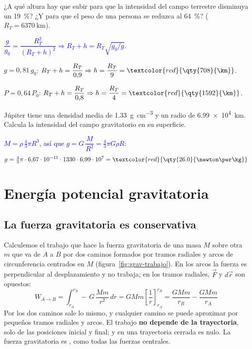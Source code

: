 \begin{exercise}
    ¿A qué altura hay que subir para que la intensidad del campo terrestre disminuya un \qty{19}{\percent}? ¿Y para que el
    peso de una persona se reduzca al \qty{64}{\percent}? (\(R_T = \qty{6370}{\km}\)).
    \begin{solu}
        \textcolor{blue}{\(\dfrac{g}{g_0} = \dfrac{R_T^2}{(R_T + h)^2} \Rightarrow R_T + h = R_T\sqrt{g_0/g}\).}

        \(g = 0{,}81\,g_0\): \(R_T + h = \dfrac{R_T}{0{,}9} \Rightarrow h = \dfrac{R_T}{9} = \textcolor{red}{\qty{708}{\km}}\).

        \(P = 0{,}64\,P_0\): \(R_T + h = \dfrac{R_T}{0{,}8} \Rightarrow h = \dfrac{R_T}{4} = \textcolor{red}{\qty{1592}{\km}}\).
    \end{solu}
\end{exercise}

\begin{exercise}
    Júpiter tiene una densidad media de \qty{1.33}{\g\per\cm\cubed} y un radio de \qty{6.99e4}{\km}. Calcula la intensidad del
    campo gravitatorio en su superficie.
    \begin{solu}
        \textcolor{blue}{\(M = \rho\,\tfrac{4}{3}\pi R^3\), así que \(g = G\,\dfrac{M}{R^2} = \tfrac{4}{3}\pi G\rho R\):}
        \[ g = \tfrac{4}{3}\pi\cdot 6{,}67\cdot 10^{-11}\cdot 1330\cdot 6{,}99\cdot 10^7 = \textcolor{red}{\qty{26.0}{\newton\per\kg}} \]
    \end{solu}
\end{exercise}

\section{Energía potencial gravitatoria}\label{sec:grav-energia}

\subsection{La fuerza gravitatoria es conservativa}\label{subsec:grav-conservativa}

Calculemos el trabajo que hace la fuerza gravitatoria de una masa \(M\) sobre otra \(m\) que va de \(A\) a \(B\) por dos
caminos formados por tramos radiales y arcos de circunferencia centrados en \(M\) (figura~\ref{fig:grav-trabajo}). En los
arcos la fuerza es perpendicular al desplazamiento y no trabaja; en los tramos radiales, \(\vec F\) y \(d\vec r\) son
opuestos:
\begin{equation*}
    W_{A\to B} = \int_{r_A}^{r_B} -\,G\,\dfrac{M m}{r^2}\,dr = G M m\left[\dfrac{1}{r}\right]_{r_A}^{r_B} = \dfrac{G M m}{r_B} - \dfrac{G M m}{r_A}
\end{equation*}
Por los dos caminos sale lo mismo, y cualquier camino se puede aproximar por pequeños tramos radiales y arcos. El trabajo
\textbf{no depende de la trayectoria}, solo de las posiciones inicial y final; y en una trayectoria cerrada es nulo. La
fuerza gravitatoria es , como todas las fuerzas centrales.

